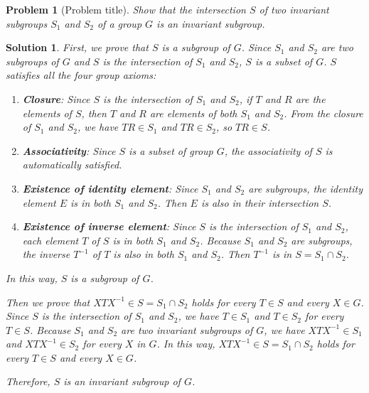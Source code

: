 \documentclass[UTF8,10pt,a4paper]{article}
\theoremstyle{Problem}
\newtheorem{prob}{Problem}
\theoremstyle{Solution}
\newtheorem*{sol}{Solution}
\begin{document}
\thispagestyle{FirstPageStyle}
\begin{prob}[Problem title]
    Show that the intersection $S$ of two invariant subgroups $S_1$ and $S_2$ of a group $G$ is an invariant subgroup.
\end{prob}
\begin{sol}
    First, we prove that $S$ is a subgroup of $G$. Since $S_1$ and $S_2$ are two subgroups of $G$ and $S$ is the intersection of $S_1$ and $S_2$, $S$ is a subset of $G$. $S$ satisfies all the four group axioms:
    \begin{enumerate}
        \item \textbf{Closure}: Since $S$ is the intersection of $S_1$ and $S_2$, if $T$ and $R$ are the elements of $S$, then $T$ and $R$ are elements of both $S_1$ and $S_2$. From the closure of $S_1$ and $S_2$, we have $TR\in S_1$ and $TR\in S_2$, so $TR\in S$.
        \item \textbf{Associativity}: Since $S$ is a subset of group $G$, the associativity of $S$ is automatically satisfied.
        \item \textbf{Existence of identity element}: Since $S_1$ and $S_2$ are subgroups, the identity element $E$ is in both $S_1$ and $S_2$. Then $E$ is also in their intersection $S$.
        \item \textbf{Existence of inverse element}: Since $S$ is the intersection of $S_1$ and $S_2$, each element $T$ of $S$ is in both $S_1$ and $S_2$. Because $S_1$ and $S_2$ are subgroups, the inverse $T^{-1}$ of $T$ is also in both $S_1$ and $S_2$. Then $T^{-1}$ is in $S=S_1\cap S_2$.
    \end{enumerate}
    In this way, $S$ is a subgroup of $G$.

    Then we prove that $XTX^{-1}\in S=S_1\cap S_2$ holds for every $T\in S$ and every $X\in G$. Since $S$ is the intersection of $S_1$ and $S_2$, we have $T\in S_1$ and $T\in S_2$ for every $T\in S$. Because $S_1$ and $S_2$ are two invariant subgroups of $G$, we have $XTX^{-1}\in S_1$ and $XTX^{-1}\in S_2$ for every $X$ in $G$. In this way, $XTX^{-1}\in S=S_1\cap S_2$ holds for every $T\in S$ and every $X\in G$.

    Therefore, $S$ is an invariant subgroup of $G$.
\end{sol}
\end{document}

